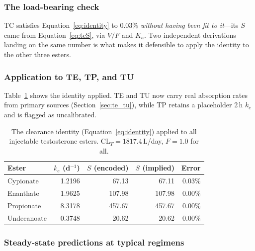\documentclass[11pt,a4paper]{article}
\newcommand{\good}[1]{#1}
\begin{document}
\subsubsection{The load-bearing check}

TC satisfies Equation~\ref{eq:identity} to 0.03\% \emph{without having
been fit to it}---its $S$ came from Equation~\ref{eq:tcS}, via $V/F$ and
$K_a$. Two independent derivations landing on the same number is what
makes it defensible to apply the identity to the other three esters.

\subsubsection{Application to TE, TP, and TU}

Table~\ref{tab:identity} shows the identity applied. TE and TU now carry
real absorption rates from primary sources (Section~\ref{sec:te_tu}),
while TP retains a placeholder 2\,h $k_e$ and is flagged as uncalibrated.

\begin{table}[h]
\centering
\small
\begin{tabular}{@{}lrrrr@{}}
\toprule
\textbf{Ester} & $k_e$ (d$^{-1}$) & $S$ (encoded) & $S$ (implied) & \textbf{Error} \\
\midrule
Cypionate   & 1.2196 & 67.13  & 67.11  & \good{0.03\%} \\
Enanthate   & 1.9625 & 107.98 & 107.98 & \good{0.00\%} \\
Propionate  & 8.3178 & 457.67 & 457.67 & \good{0.00\%} \\
Undecanoate & 0.3748 & 20.62  & 20.62  & \good{0.00\%} \\
\bottomrule
\end{tabular}
\caption{The clearance identity (Equation~\ref{eq:identity}) applied to
all injectable testosterone esters. $\mathrm{CL}_T = 1817.4$\,L/day,
$F = 1.0$ for all.}
\label{tab:identity}
\end{table}

\subsubsection{Steady-state predictions at typical regimens}
\end{document}
